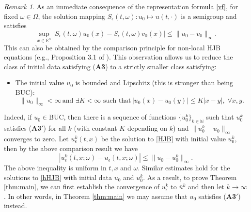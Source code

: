 \documentclass[11pt,reqno]{amsart}
\theoremstyle{definition}
\theoremstyle{remark}
\newtheorem{rem}{Remark}[section]
\numberwithin{equation}{section}
\newcommand{\eps}{\epsilon}
\newcommand{\R}{{\mathbb{R}}}
\begin{document}
\begin{rem}\label{rem:BLip} As an immediate consequence of the representation formula \eqref{vf}, for fixed $\omega \in \Omega$, the solution mapping $S_\eps(t,\omega): u_0 \mapsto u(t,\cdot)$ is a semigroup and satisfies
\begin{equation*}
    \sup_{x\in \R^n} \left| S_\eps(t,\omega)u_0(x) - S_\eps(t,\omega)v_0(x) \right| \le \|u_0-v_0\|_\infty.
\end{equation*}
This can also be obtained by the comparison principle for non-local HJB equations (e.g., Proposition 3.1 of \cite{MR3385169}). This observation allows us to reduce the class of initial data satisfying ({\bf A3}) to a strictly smaller class satisfying:
\begin{itemize}
\item[({\bf A3$'$})] The initial value $u_0$ is bounded and Lipschitz (this is stronger than being BUC):
\begin{equation}\label{BLip}
    \|u_0\|_\infty < \infty \, \text{and $\exists K < \infty$ such that}\, |u_0(x)-u_0(y)|\le K|x-y|, \; \forall x,y.
\end{equation}
\end{itemize}
Indeed, if $u_0 \in \mathrm{BUC}$, then there is a sequence of functions $\{u_0^{k}\}_{k\in \mathbb{N}}$ such that $u_0^k$ satisfies ({\bf A3$'$}) for all $k$ (with constant $K$ depending on $k$) and $\|u_0^k-u_0\|_\infty$ converges to zero. Let $u^k_\eps(t,x)$ be the solution to \eqref{HJB} with initial value $u_0^k$, then by the above comparison result we have
\begin{equation*}
    |u^k_\eps(t,x;\omega)-u_\eps(t,x;\omega)| \le \|u_0 - u_0^k\|_\infty.
\end{equation*}
The above inequality is uniform in $t,x$ and $\omega$. Similar estimates hold for the solutions to \eqref{hHJB} with initial data $u_0$ and $u_0^k$. As a result, to prove Theorem \ref{thm:main}, we can first establish the convergence of $u^k_\eps$ to $\overline{u}^k$ and then let $k\to \infty$. In other words, in Theorem \ref{thm:main} we may assume that $u_0$ satisfies ({\bf A3$'$}) instead.
\end{rem}
\end{document}
